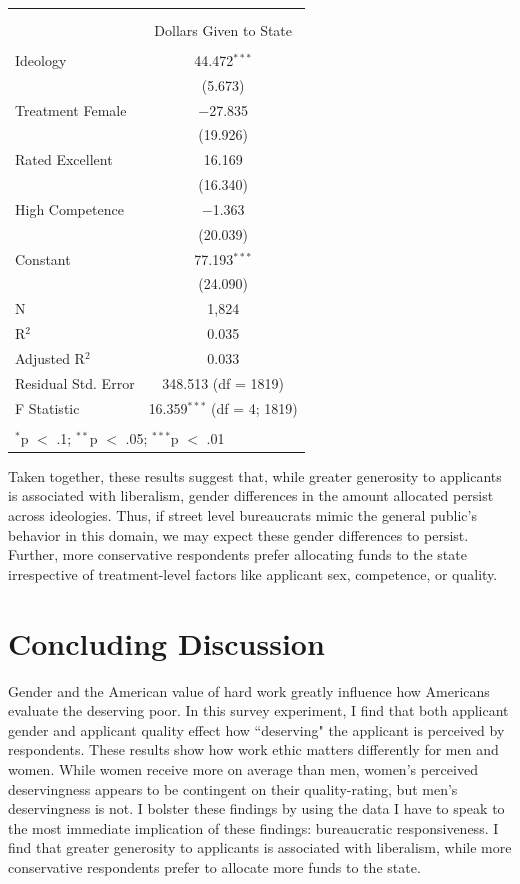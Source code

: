 \documentclass[12pt]{article}%
\begin{document}
\begin{doublespace}
\begin{table}[!htbp] \centering 
	\caption{} 
	\label{table}
	\begin{tabular}{@{\extracolsep{5pt}}lc} 
		\\[-1.8ex]\hline \\[-1.8ex] 
		\\[-1.8ex] & Dollars Given to State \\ 
		\hline \\[-1.8ex] 
		Ideology & 44.472$^{***}$ \\ 
		& (5.673) \\ 
		Treatment Female & $-$27.835 \\ 
		& (19.926) \\ 
		Rated Excellent & 16.169 \\ 
		& (16.340) \\ 
		High Competence & $-$1.363 \\ 
		& (20.039) \\ 
		Constant & 77.193$^{***}$ \\ 
		& (24.090) \\ 
		N & 1,824 \\ 
		R$^{2}$ & 0.035 \\ 
		Adjusted R$^{2}$ & 0.033 \\ 
		Residual Std. Error & 348.513 (df = 1819) \\ 
		F Statistic & 16.359$^{***}$ (df = 4; 1819) \\ 
		\hline \\[-1.8ex] 
		\multicolumn{2}{l}{$^{*}$p $<$ .1; $^{**}$p $<$ .05; $^{***}$p $<$ .01} \\ 
	\end{tabular} 
\end{table} 

Taken together, these results suggest that, while greater generosity to applicants is associated with liberalism, gender differences in the amount allocated persist across ideologies. Thus, if street level bureaucrats mimic the general public’s behavior in this domain, we may expect these gender differences to persist. Further, more conservative respondents prefer allocating funds to the state irrespective of treatment-level factors like applicant sex, competence, or quality.

\section*{Concluding Discussion} 
Gender and the American value of hard work greatly influence how Americans evaluate the deserving poor. In this survey experiment, I find that both applicant gender and applicant quality effect how ``deserving" the applicant is perceived by respondents. These results show how work ethic matters differently for men and women. While women receive more on average than men, women's perceived deservingness appears to be contingent on their quality-rating, but men's deservingness is not. I bolster these findings by using the data I have to speak to the most immediate implication of these findings: bureaucratic responsiveness. I find that greater generosity to applicants is associated with liberalism, while more conservative respondents prefer to allocate more funds to the state.

\end{doublespace}



\end{document}
